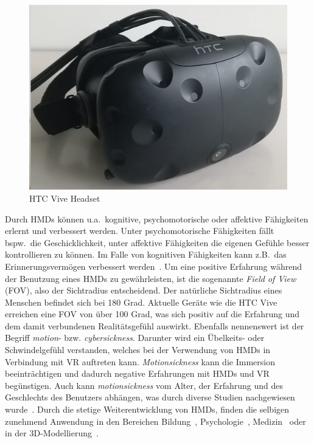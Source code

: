 \begin{figure}[h]
\captionsetup{width=.7\linewidth}
\includegraphics[scale=0.75]{Bilder/Hauptteil/viveheadset}
\centering
\caption{HTC Vive Headset}
\label{fig:hmds}
\end{figure}

\noindent Durch HMDs können u.a.~kognitive, psychomotorische oder affektive Fähigkeiten erlernt und verbessert werden. Unter psychomotorische Fähigkeiten fällt bspw.~die Geschicklichkeit, unter affektive Fähigkeiten die eigenen Gefühle besser kontrollieren zu können. Im Falle von kognitiven Fähigkeiten kann z.B.~das Erinnerungs\-vermögen verbessert werden~\cite{hmdsineducation}. Um eine positive Erfahrung während der Benutzung eines HMDs zu gewährleisten, ist die sogenannte \textit{Field of View} (FOV), also der Sichtradius entscheidend. Der natürliche Sichtradius eines Menschen befindet sich bei 180 Grad. Aktuelle Geräte wie die HTC Vive erreichen eine FOV von über 100 Grad, was sich positiv auf die Erfahrung und dem damit verbundenen Realitätsgefühl auswirkt. Ebenfalls nennenswert ist der Begriff \textit{motion}- bzw. \textit{cybersickness}. Darunter wird ein Übelkeits- oder Schwindelgefühl verstanden, welches bei der Verwendung von HMDs in Verbindung mit VR auftreten kann. \textit{Motionsickness} kann die Immersion beeinträchtigen und dadurch negative Erfahrungen mit HMDs und VR begünstigen. Auch kann \textit{motionsickness} vom Alter, der Erfahrung und des Geschlechts des Benutzers abhängen, was durch diverse Studien nachgewiesen wurde~\cite{hmdsineducation}. Durch die stetige Weiterentwicklung von HMDs, finden die selbigen zunehmend Anwendung in den Bereichen Bildung~\cite{hmdsineducation}, Psychologie~\cite{hmdsinpsychology}, Medizin~\cite{hmdsinmedicine} oder in der 3D-Modellierung~\cite{hmdsinmodeling}.

